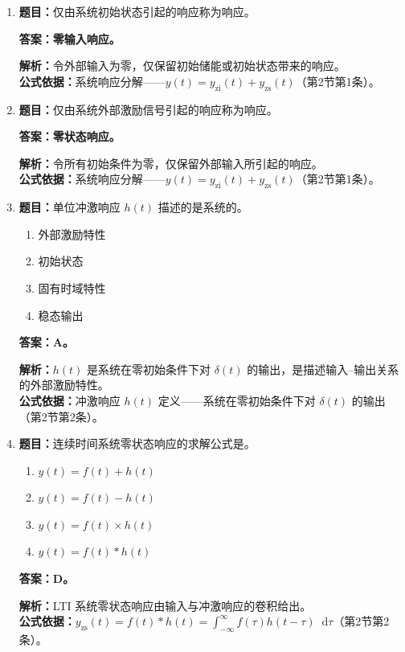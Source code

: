 \documentclass[12pt,a4paper]{ctexart}
\newcommand{\dif}{\mathop{}\!\mathrm{d}}
\begin{document}
\begin{enumerate}[label=\arabic*.]
\item \textbf{题目：}仅由系统初始状态引起的响应称为\underline{\hspace{1.5cm}}响应。\par
\textbf{答案：零输入响应。}\par
\textbf{解析：}令外部输入为零，仅保留初始储能或初始状态带来的响应。\\
\textbf{公式依据：}系统响应分解——$y(t)=y_{\mathrm{zi}}(t)+y_{\mathrm{zs}}(t)$（第2节第1条）。

\item \textbf{题目：}仅由系统外部激励信号引起的响应称为\underline{\hspace{1.5cm}}响应。\par
\textbf{答案：零状态响应。}\par
\textbf{解析：}令所有初始条件为零，仅保留外部输入所引起的响应。\\
\textbf{公式依据：}系统响应分解——$y(t)=y_{\mathrm{zi}}(t)+y_{\mathrm{zs}}(t)$（第2节第1条）。

\item \textbf{题目：}单位冲激响应 $h(t)$ 描述的是系统的\underline{\hspace{1.5cm}}。
\begin{enumerate}[label=\Alph*.]
\item 外部激励特性
\item 初始状态
\item 固有时域特性
\item 稳态输出
\end{enumerate}
\textbf{答案：A。}\par
\textbf{解析：}$h(t)$ 是系统在零初始条件下对 $\delta(t)$ 的输出，是描述输入--输出关系的外部激励特性。\\
\textbf{公式依据：}冲激响应 $h(t)$ 定义——系统在零初始条件下对 $\delta(t)$ 的输出（第2节第2条）。

\item \textbf{题目：}连续时间系统零状态响应的求解公式是\underline{\hspace{1.5cm}}。
\begin{enumerate}[label=\Alph*.]
\item $y(t)=f(t)+h(t)$
\item $y(t)=f(t)-h(t)$
\item $y(t)=f(t)\times h(t)$
\item $y(t)=f(t)*h(t)$
\end{enumerate}
\textbf{答案：D。}\par
\textbf{解析：}LTI 系统零状态响应由输入与冲激响应的卷积给出。\\
\textbf{公式依据：}$y_{\mathrm{zs}}(t)=f(t)*h(t)=\int_{-\infty}^{\infty}f(\tau)h(t-\tau)\dif\tau$（第2节第2条）。


\end{enumerate}
\end{document}
